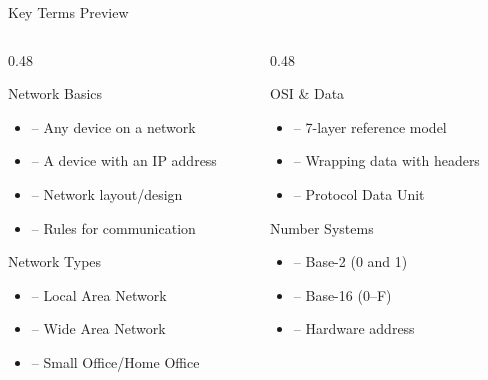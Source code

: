 \documentclass[aspectratio=169]{beamer}  %
\begin{document}
\begin{frame}{Key Terms Preview}
    \begin{columns}[T]
        \begin{column}{0.48\textwidth}
            \begin{block}{Network Basics}
                \begin{itemize}
                    \item {} -- Any device on a network
                    \item {} -- A device with an IP address
                    \item {} -- Network layout/design
                    \item {} -- Rules for communication
                \end{itemize}
            \end{block}
            \vspace{0.3em}
            \begin{block}{Network Types}
                \begin{itemize}
                    \item {} -- Local Area Network
                    \item {} -- Wide Area Network
                    \item {} -- Small Office/Home Office
                \end{itemize}
            \end{block}
        \end{column}
        \begin{column}{0.48\textwidth}
            \begin{block}{OSI \& Data}
                \begin{itemize}
                    \item {} -- 7-layer reference model
                    \item {} -- Wrapping data with headers
                    \item {} -- Protocol Data Unit
                \end{itemize}
            \end{block}
            \vspace{0.3em}
            \begin{block}{Number Systems}
                \begin{itemize}
                    \item {} -- Base-2 (0 and 1)
                    \item {} -- Base-16 (0--F)
                    \item {} -- Hardware address
                \end{itemize}
            \end{block}
        \end{column}
    \end{columns}
\end{frame}
\end{document}
